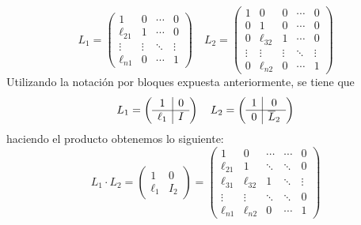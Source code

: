 \begin{met}
\begin{dem}
$$L_1=\left(\begin{array}{c|ccc}
           1 & 0 & \cdots & 0 \\
           \hline
           \ell_{21} & 1 & \cdots & 0 \\
           \vdots &\vdots &  \ddots & \vdots \\
           \ell_{n1} & 0 & \cdots & 1 
       \end{array}\right) \quad L_2=\left(\begin{array}{c|cccc}
   1  &0&0&\cdots&0  \\
   \hline
    0 & 1&0&\cdots&0\\
    0 &\ell_{32}&1&\cdots&0\\
    \vdots &\vdots&\vdots & \ddots & \vdots\\
    0&\ell_{n2}&0&\cdots & 1
\end{array}\right)$$
Utilizando la notación por bloques expuesta anteriormente, se tiene que
$$L_1=\left(\begin{array}{c| c}
   1  &0  \\
   \hline \ell_1 & I 
\end{array}\right) \quad  L_2=\left(\begin{array}{c| c}
   1  & 0  \\
   \hline 0 & \overline{L}_2 
\end{array}\right)$$
haciendo el producto obtenemos lo siguiente:
$$L_1\cdot L_2=\left(\begin{array}{cc}
   1  & 0 \\
   \ell_1  & I_2 
\end{array}\right)=\left(\begin{array}{ccccc}
   1  &0&\cdots&\cdots&0  \\
    \ell_{21} & 1&\ddots&\ddots&0\\
    \ell_{31} &\ell_{32}&1&\ddots&\vdots\\
    \vdots &\vdots&\ddots & \ddots & 0\\
    \ell_{n1}&\ell_{n2}&0&\cdots & 1
\end{array}\right)$$


\end{dem}
\end{met}
